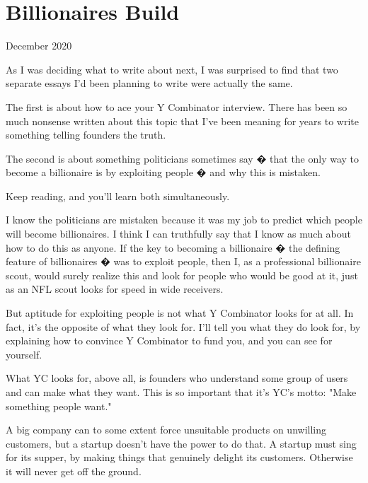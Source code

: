 \chapter{Billionaires Build}


            
              
                

December 2020

As I was deciding what to write
                  about next, I was surprised to find that two separate essays
                  I'd been planning to write were actually the same.

The
                  first is about how to ace your Y Combinator interview. There
                  has been so much nonsense written about this topic that I've
                  been meaning for years to write something telling founders the
                  truth.

The second is about something politicians
                  sometimes say � that the only way to become a billionaire is
                  by exploiting people � and why this is mistaken.

Keep
                  reading, and you'll learn both simultaneously.

I
                  know the politicians are mistaken because it was my job to
                  predict which people will become billionaires. I think I can
                  truthfully say that I know as much about how to do this as
                  anyone. If the key to becoming a billionaire � the defining
                  feature of billionaires � was to exploit people, then I, as a
                  professional billionaire scout, would surely realize this and
                  look for people who would be good at it, just as an NFL scout
                  looks for speed in wide receivers.

But aptitude for
                  exploiting people is not what Y Combinator looks for at all.
                  In fact, it's the opposite of what they look for. I'll tell
                  you what they do look for, by explaining how to convince
                  Y Combinator to fund you, and you can see for
                  yourself.

What YC looks for, above all, is founders
                  who understand some group of users and can make what they
                  want. This is so important that it's YC's motto: "Make
                  something people want."

A big company can to some
                  extent force unsuitable products on unwilling customers, but a
                  startup doesn't have the power to do that. A startup must sing
                  for its supper, by making things that genuinely delight its
                  customers. Otherwise it will never get off the ground.

